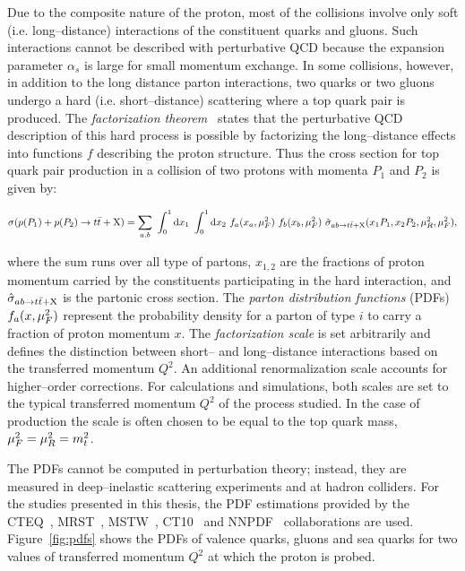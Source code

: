 Due to the composite nature of the proton, most of the
collisions involve only soft (i.e. long--distance) interactions of the
constituent quarks and gluons. Such interactions cannot be described
with perturbative QCD because the expansion parameter $\alpha_s$ is
large for small momentum exchange.
In some collisions, however, in addition to the long distance parton
interactions, two quarks or two gluons undergo a hard
(i.e. short--distance) scattering where a top quark pair is produced.
The {\it factorization theorem}~\cite{factorprinciple} states that
the perturbative QCD description of this hard process is possible by
factorizing the long--distance effects into functions $f$ describing the
proton structure. Thus the cross section for top quark pair
production in a collision of two protons with momenta $P_1$ and $P_2$
is given by:\par\noindent
{\small
\begin{equation}
  \sigma(p(P_1)+p(P_2)\to t\bar{t}{}+{\rm X})
  = 
  \sum_{a,b}
  ~\int_0^1{\rm d}x_1
  ~\int_0^1{\rm d}x_2
  ~ f_a(x_a,\mu_F^2{})~f_b(x_b,\mu_F^2)
  ~\hat{\sigma}_{ab\to t\bar{t}{}+\rm{X}}(x_1P_1,x_2P_2,\mu_R^2{},\mu_F^2{}),
  \label{eq:ttbarxs}
\end{equation}
}\par\noindent
where the sum runs over all type of partons, $x_{1,2}$ are the
fractions of proton momentum carried by the constituents participating
in the hard interaction, and $\hat{\sigma}_{ab\to t\bar{t}{}+\rm{X}}$ is
  the partonic cross section. 
The {\it parton distribution functions} (PDFs) $f_a(x,\mu_F^2{})$
represent the probability density for a parton of type $i$ to carry
a fraction of proton momentum $x$. The {\it factorization scale}
\factscale{} is set arbitrarily and defines the distinction between
short-- and long--distance interactions based on the transferred
momentum $Q^2$. An additional renormalization scale \renormscale{}
accounts for higher--order corrections. For calculations and
simulations, both scales are set to the typical transferred momentum $Q^2$
of the process studied. In the case of \ttbar{} production the scale
is often chosen to be equal to the top quark mass,
$\mu_F^2{}=\mu_R^2{}=m_t^2$.
  
The PDFs cannot be computed in perturbation theory; instead, they are
measured in deep--inelastic scattering experiments and at hadron colliders.
For the studies presented in this thesis, the PDF estimations
provided by the CTEQ~\cite{cteq6}, MRST~\cite{mrst}, MSTW~\cite{mstw},
CT10~\cite{ct10} and NNPDF~\cite{nnpdf} collaborations are
used. Figure~\ref{fig:pdfs} shows the PDFs of valence quarks, gluons and
sea quarks for two values of transferred momentum $Q^2$ at which the
proton is probed. 

